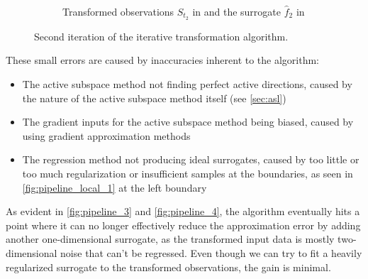 \documentclass[
  a4paper,  %
  twoside,  %
  bibliography=totoc,
  headsepline,
  cleardoublepage=empty,
  parskip=half,
  draft=false
]{scrbook}
\begin{document}
\begin{mdframed}[style=style]
\begin{figure}[H]
\begin{subfigure}{.5\textwidth}
  \caption{Transformed observations $S_{t_2}$ in \blue and the surrogate $\hat{f}_2$ in \reddot}
\label{fig:pipeline_local_2}
\end{subfigure}
\delimit
\caption{Second iteration of the iterative transformation algorithm.}
\label{fig:pipeline_2}
\end{figure}
\end{mdframed}

\newpage

\noindent
These small errors are caused by inaccuracies inherent to the algorithm:
\begin{itemize}
\item The active subspace method not finding perfect active directions, caused by the nature of the active subspace method itself (see \cref{sec:asl})
\item The gradient inputs for the active subspace method being biased, caused by using gradient approximation methods
\item The regression method not producing ideal surrogates, caused by too little or too much regularization or insufficient samples at the boundaries, as seen in \cref{fig:pipeline_local_1} at the left boundary
\end{itemize}
%
As evident in \cref{fig:pipeline_3} and \cref{fig:pipeline_4}, the algorithm eventually hits a point where it can no longer effectively reduce the approximation error by adding another one-dimensional surrogate, as the transformed input data is mostly two-dimensional noise that can't be regressed.
Even though we can try to fit a heavily regularized surrogate to the transformed observations, the gain is minimal.
\end{document}

